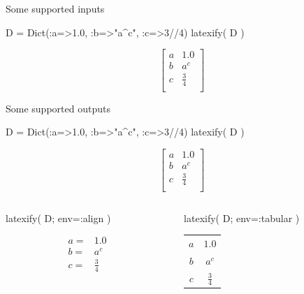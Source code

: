 \documentclass{beamer}
\begin{document}
\begin{frame}[fragile]{Some supported inputs}
\begin{onlyenv}
    \begin{juliacode}
      D = Dict(:a=>1.0, :b=>"a^c", :c=>3//4)
      latexify( D )
    \end{juliacode}
    \vspace{-5mm}
\begin{equation*}
\left[
\begin{array}{cc}
a & 1.0 \\
b & a^{c} \\
c & \frac{3}{4} \\
\end{array}
\right]
\end{equation*}
  \end{onlyenv}

\end{frame}

\begin{frame}[fragile]{Some supported outputs}
  \begin{juliacode}
  D = Dict(:a=>1.0, :b=>"a^c", :c=>3//4)
  latexify( D )
  \end{juliacode}
    \vspace{-5mm}
  \footnotesize
\begin{equation*}
\left[
\begin{array}{cc}
a & 1.0 \\
b & a^{c} \\
c & \frac{3}{4} \\
\end{array}
\right]
\end{equation*}

\begin{columns}[t]
\begin{column}{0.5\textwidth}
\begin{juliacode}
  latexify( D; env=:align )
\end{juliacode}
  \footnotesize
\begin{align*}
a =& 1.0 \\
b =& a^{c} \\
c =& \frac{3}{4} \\
\end{align*}
\end{column}
\begin{column}{0.5\textwidth}  %
\begin{juliacode}
  latexify( D; env=:tabular )
\end{juliacode}
  \footnotesize
\begin{tabular}{cc}
$a$ & $1.0$\\
$b$ & $a^{c}$\\
$c$ & $\frac{3}{4}$\\
\end{tabular}


\end{column}
\end{columns}
\end{frame}
\end{document}
